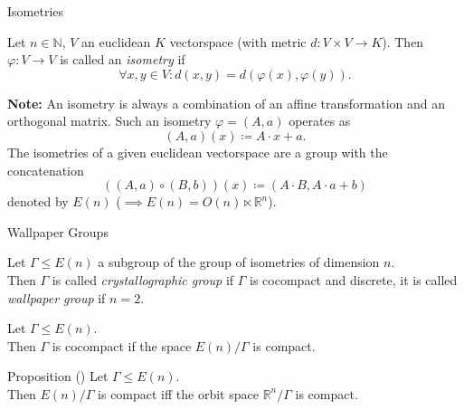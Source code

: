 \documentclass{beamer}
\numberwithin{equation}{aufgabe}
\newcommand\R{\mathbb R}
\newcommand\N{\mathbb N}
\renewcommand{\phi}{\varphi}
\begin{document}
\begin{frame}{Isometries}
    \begin{definition}
        Let $n \in \N$, $V$ an euclidean $K$ vectorspace (with metric $d: V \times V \to K$).
        Then $\phi: V \to V$ is called an \emph{isometry} if \pause
        $$
            \forall x, y \in V : d(x, y) = d(\phi(x), \phi(y)).
        $$
    \end{definition}
    \pause
    \textbf{Note:} An isometry is always a combination of an affine transformation and an orthogonal matrix. Such an isometry $\phi = (A, a)$ operates as 
    $$
        (A, a)(x) \coloneqq A \cdot x + a.
    $$
    \pause
    The isometries of a given euclidean vectorspace are a group with the concatenation 
    $$
        \left( (A, a) \circ (B, b) \right) (x) \coloneqq (A \cdot B, A\cdot a + b)
    $$
    denoted by $E(n)$ \pause ($ \implies E(n) = O(n) \ltimes \R^n$).
\end{frame}
\begin{frame}{Wallpaper Groups}
    \begin{definition}
        Let $\Gamma \leq E(n)$ a subgroup of the group of isometries of dimension $n$.\\
        Then $\Gamma$ is called \emph{crystallographic group} if $\Gamma$ is cocompact and discrete, \pause it is called \emph{wallpaper group} if $n=2$.
    \end{definition}
    \pause
    \begin{definition}
        Let $\Gamma \leq E(n)$. \\ \pause
        Then $\Gamma$ is cocompact if the space $E(n) / \Gamma$ is compact.
    \end{definition}
    \pause
    \begin{block}{Proposition (\cite[Prop. 1.9]{szczepanski2012geometry})}
        Let $\Gamma \leq E(n)$. \\
        Then $E(n)/\Gamma$ is compact iff the orbit space $\R^n / \Gamma$ is compact.
    \end{block}
\end{frame}
\end{document}
